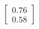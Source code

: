 \documentclass[preview]{standalone}
\begin{document}
\begin{align*}
\begin{bmatrix} 0.76 \\ 0.58 \end{bmatrix}
\end{align*}
\end{document}

